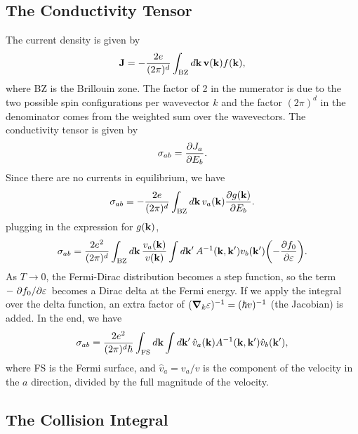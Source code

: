 \documentclass[12pt]{article}
\begin{document}
\subsection{The Conductivity Tensor}
The current density is given by
\begin{equation}
    \vb{J} = -\frac{2e}{(2\pi)^d} \int_{\text{BZ}} \dd{\vb{k}} \vb{v}(\vb{k}) f(\vb{k}),
\end{equation}
where BZ is the Brillouin zone. The factor of 2 in the numerator is due to the two possible spin
configurations per wavevector $k$ and the factor $(2\pi)^d$ in the denominator comes from the
weighted sum over the wavevectors. The conductivity tensor is given by
\begin{equation}
    \sigma_{ab} = \pdv{J_a}{E_b}.
\end{equation}
Since there are no currents in equilibrium, we have
\begin{equation}
    \sigma_{ab} = -\frac{2e}{(2\pi)^d} \int_{\text{BZ}}\dd{\vb{k}} v_a(\vb{k}) \pdv{g(\vb{k})}{E_b}.
\end{equation}
plugging in the expression for $g(\vb{k})$,
\begin{equation}
    \sigma_{ab} = \frac{2e^2}{(2\pi)^d} \int_{\text{BZ}}\dd{\vb{k}} \frac{v_a(\vb{k})}{v(\vb{k})}
    \int\dd{\vb{k'}} A^{-1}(\vb{k}, \vb{k'}) v_b(\vb{k'})\qty(-\pdv{f_0}{\varepsilon}).
\end{equation}
As $T\to0$, the Fermi-Dirac distribution becomes a step function, so the term
$-\pdv*{f_0}{\varepsilon}$ becomes a Dirac delta at the Fermi energy. If we apply the integral over
the delta function, an extra factor of $(\grad_{k}\varepsilon)^{-1} = (\hbar v)^{-1}$ (the Jacobian)
is added. In the end, we have
\begin{equation}
    \sigma_{ab} = \frac{2e^2}{(2\pi)^d\hbar} \int_{\text{FS}}\dd{\vb{k}}\int\dd{\vb{k'}}
    \hat{v}_a(\vb{k}) A^{-1}(\vb{k}, \vb{k'}) \hat{v}_b(\vb{k'}),
    \label{eq:conductivity}
\end{equation}
where FS is the Fermi surface, and $\hat{v}_a=v_a/v$ is the component of the velocity in the
$a$ direction, divided by the full magnitude of the velocity.

\subsection{The Collision Integral}
\end{document}
